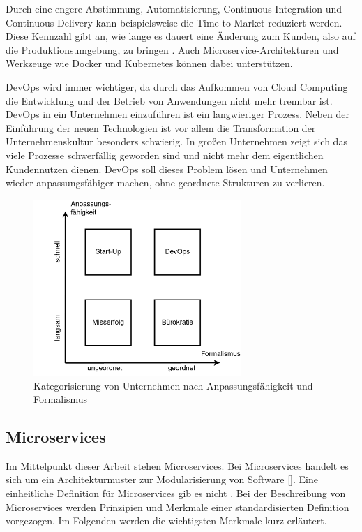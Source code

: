 Durch eine engere Abstimmung, Automatisierung, Continuous-Integration und Continuous-Delivery kann beispielsweise die Time-to-Market reduziert werden. Diese Kennzahl gibt an, wie lange es dauert eine Änderung zum Kunden, also auf die Produktionsumgebung, zu bringen \parencite[vgl.][S. 7]{halstenbergDevOps2020}. Auch Microservice-Architekturen und Werkzeuge wie Docker und Kubernetes können dabei unterstützen.

DevOps wird immer wichtiger, da durch das Aufkommen von Cloud Computing die Entwicklung und der Betrieb von Anwendungen nicht mehr trennbar ist. DevOps in ein Unternehmen einzuführen ist ein langwieriger Prozess. Neben der Einführung der neuen Technologien ist vor allem die Transformation der Unternehmenskultur besonders schwierig. In großen Unternehmen zeigt sich das viele Prozesse schwerfällig geworden sind und nicht mehr dem eigentlichen Kundennutzen dienen. DevOps soll dieses Problem lösen und Unternehmen wieder anpassungsfähiger machen, ohne geordnete Strukturen zu verlieren.

\begin{figure}[H] 
    \centering
    \includegraphics[width=0.7\textwidth]{figures/DevOpsDiagramm.png}
    \caption{Kategorisierung von Unternehmen nach Anpassungsfähigkeit und Formalismus \parencite[vgl.][S. 11]{halstenbergDevOps2020}}
\end{figure}

\subsection{Microservices}

Im Mittelpunkt dieser Arbeit stehen Microservices. Bei Microservices handelt es sich um ein Architekturmuster zur Modularisierung von Software [\cite[S. 15]{newmanMicroservices2015}]. Eine einheitliche Definition für Microservices gib es nicht \parencite[vgl.][S. 2]{wolffMicroservices2018}. Bei der Beschreibung von Microservices werden Prinzipien und Merkmale einer standardisierten Definition vorgezogen. Im Folgenden werden die wichtigsten Merkmale kurz erläutert.

